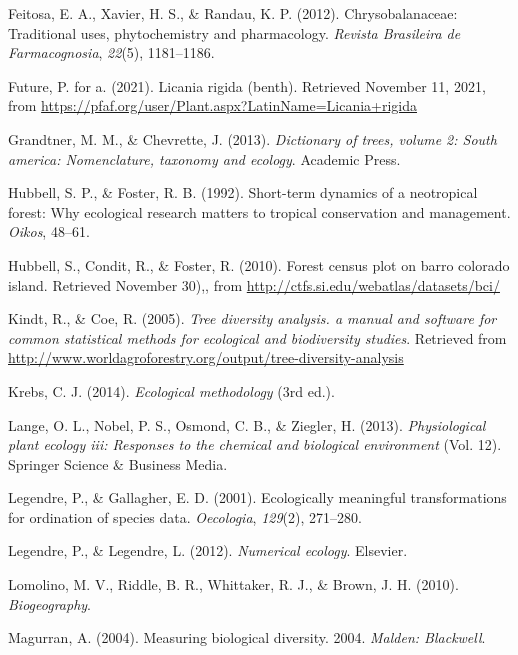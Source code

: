 \documentclass[11pt,]{article}
\begin{document}
\hypertarget{ref-feitosa2012chrysobalanaceae}{}
Feitosa, E. A., Xavier, H. S., \& Randau, K. P. (2012).
Chrysobalanaceae: Traditional uses, phytochemistry and pharmacology.
\emph{Revista Brasileira de Farmacognosia}, \emph{22}(5), 1181--1186.

\hypertarget{ref-PfafLrigida}{}
Future, P. for a. (2021). Licania rigida (benth). Retrieved November 11,
2021, from
\url{https://pfaf.org/user/Plant.aspx?LatinName=Licania+rigida}

\hypertarget{ref-grandtner2013dictionary}{}
Grandtner, M. M., \& Chevrette, J. (2013). \emph{Dictionary of trees,
volume 2: South america: Nomenclature, taxonomy and ecology}. Academic
Press.

\hypertarget{ref-hubbell1992short}{}
Hubbell, S. P., \& Foster, R. B. (1992). Short-term dynamics of a
neotropical forest: Why ecological research matters to tropical
conservation and management. \emph{Oikos}, 48--61.

\hypertarget{ref-Hubbell2010Forest}{}
Hubbell, S., Condit, R., \& Foster, R. (2010). Forest census plot on
barro colorado island. Retrieved November 30),, from
\url{http://ctfs.si.edu/webatlas/datasets/bci/}

\hypertarget{ref-biodiversityR}{}
Kindt, R., \& Coe, R. (2005). \emph{Tree diversity analysis. a manual
and software for common statistical methods for ecological and
biodiversity studies}. Retrieved from
\url{http://www.worldagroforestry.org/output/tree-diversity-analysis}

\hypertarget{ref-krebs1999ecological}{}
Krebs, C. J. (2014). \emph{Ecological methodology} (3rd ed.).

\hypertarget{ref-lange2013physiological}{}
Lange, O. L., Nobel, P. S., Osmond, C. B., \& Ziegler, H. (2013).
\emph{Physiological plant ecology iii: Responses to the chemical and
biological environment} (Vol. 12). Springer Science \& Business Media.

\hypertarget{ref-legendre2001ecologically}{}
Legendre, P., \& Gallagher, E. D. (2001). Ecologically meaningful
transformations for ordination of species data. \emph{Oecologia},
\emph{129}(2), 271--280.

\hypertarget{ref-legendre2012numerical}{}
Legendre, P., \& Legendre, L. (2012). \emph{Numerical ecology}.
Elsevier.

\hypertarget{ref-lomolino2017biogeography}{}
Lomolino, M. V., Riddle, B. R., Whittaker, R. J., \& Brown, J. H.
(2010). \emph{Biogeography}.

\hypertarget{ref-magurran2004measuring}{}
Magurran, A. (2004). Measuring biological diversity. 2004. \emph{Malden:
Blackwell}.
\end{document}
